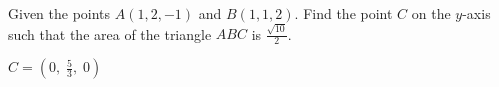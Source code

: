 
\begin{Exercise}[
name={},
title={}, 
difficulty=0,
origin={\cite{BS}}]
Given the points $A(1, 2, -1)$ and $B(1, 1, 2)$.  Find the point $C$ on the $y$-axis such that the area of the triangle $ABC$ is $\frac{\sqrt{10}}{2}$.
\end{Exercise}

\begin{Answer}
$C=\left(0,\;\frac53,\;0\right)$
\end{Answer}
